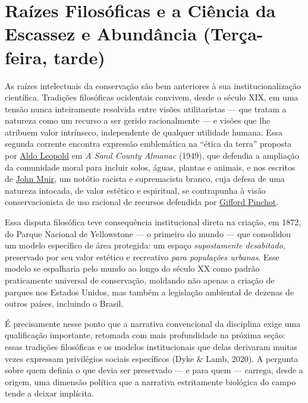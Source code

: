 \documentclass[
  portuguese,
  letterpaper,
  DIV=11,
  numbers=noendperiod]{scrartcl}
\begin{document}
\section{Raízes Filosóficas e a Ciência da Escassez e Abundância
(Terça-feira,
tarde)}\label{rauxedzes-filosuxf3ficas-e-a-ciuxeancia-da-escassez-e-abunduxe2ncia-teruxe7a-feira-tarde}

As raízes intelectuais da conservação são bem anteriores à sua
institucionalização científica. Tradições filosóficas ocidentais
convivem, desde o século XIX, em uma tensão nunca inteiramente resolvida
entre visões utilitaristas --- que tratam a natureza como um recurso a
ser gerido racionalmente --- e visões que lhe atribuem valor intrínseco,
independente de qualquer utilidade humana. Essa segunda corrente
encontra expressão emblemática na ``ética da terra'' proposta por
\href{https://pt.wikipedia.org/wiki/Aldo_Leopold}{Aldo Leopold} em
\emph{A Sand County Almanac} (1949), que defendia a ampliação da
comunidade moral para incluir solos, águas, plantas e animais, e nos
escritos de
\href{https://www.nytimes.com/2020/07/22/us/sierra-club-john-muir.html}{John
Muir}, um notótio racista e supremacista branco, cuja defesa de uma
natureza intocada, de valor estético e espiritual, se contrapunha à
visão conservacionista de uso racional de recursos defendida por
\href{https://pt.wikipedia.org/wiki/Gifford_Pinchot}{Gifford Pinchot}.

Essa disputa filosófica teve consequência institucional direta na
criação, em 1872, do Parque Nacional de Yellowstone --- o primeiro do
mundo --- que consolidou um modelo específico de área protegida: um
espaço \emph{supostamente desabitado}, preservado por seu valor estético
e recreativo \emph{para populações urbanas}. Esse modelo se espalharia
pelo mundo ao longo do século XX como padrão praticamente universal de
conservação, moldando não apenas a criação de parques nos Estados
Unidos, mas também a legislação ambiental de dezenas de outros países,
incluindo o Brasil.

É precisamente nesse ponto que a narrativa convencional da disciplina
exige uma qualificação importante, retomada com mais profundidade na
próxima seção: essas tradições filosóficas e os modelos institucionais
que delas derivaram muitas vezes expressam privilégios sociais
específicos (Dyke \& Lamb, 2020). A pergunta sobre quem definia o que
devia ser preservado --- e para quem --- carrega, desde a origem, uma
dimensão política que a narrativa estritamente biológica do campo tende
a deixar implícita.
\end{document}

